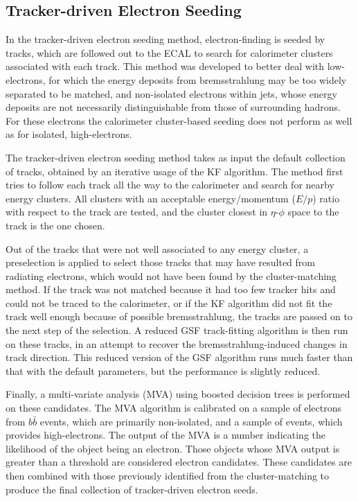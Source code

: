 \subsection{Tracker-driven Electron Seeding}
\label{evReco:trkDrv}
In the tracker-driven electron seeding method, 
electron-finding is seeded by tracks, 
which are followed out to the 
ECAL to search for calorimeter clusters 
associated with each track.  
This method was developed to better deal with 
low-\pT electrons, for which the energy deposits 
from bremsstrahlung may be too widely separated 
to be matched,  
and non-isolated electrons within jets, 
whose energy deposits are not necessarily 
distinguishable from those of surrounding hadrons.  
For these electrons the calorimeter cluster-based 
seeding does not perform as well as for 
isolated, high-\pT electrons.  

The tracker-driven electron seeding method 
takes as input the default collection 
of tracks, obtained by an iterative usage 
of the KF algorithm.  
The method first tries to follow each track 
all the way to the calorimeter and search 
for nearby energy clusters.  
All clusters with an acceptable 
energy/momentum ($E/p$) ratio 
with respect to the track are tested, 
and the cluster closest in $\eta$-$\phi$ 
space to the track is the one chosen. 
 
Out of the tracks that were not 
well associated to any energy cluster, 
a preselection is applied to select 
those tracks that may have resulted from 
radiating electrons, 
which would not have been found 
by the cluster-matching method.  
If the track was not matched because it had 
too few tracker hits and could not be traced 
to the calorimeter, 
or if the KF algorithm did not fit the 
track well enough because of possible 
bremsstrahlung, the tracks are passed 
on to the next step of the selection.  
A reduced GSF track-fitting algorithm 
is then run on these tracks, 
in an attempt to recover the 
bremsstrahlung-induced changes in track direction. 
This reduced version of the GSF algorithm runs 
much faster than that with the default parameters, 
but the performance is slightly reduced.  

Finally, a multi-variate analysis (MVA) using 
boosted decision trees 
is performed on these candidates.  
The MVA algorithm is 
calibrated 
on a sample of electrons from 
$b \bar{b}$ events, which are primarily non-isolated, 
and a sample of \Zee events, 
which provides high-\pT electrons.  
The output of the MVA is a number indicating 
the likelihood of the object being an electron.   
Those objects whose MVA output is greater than a threshold 
are considered electron candidates. 
These candidates are then combined with those 
previously identified from the cluster-matching 
to produce the final collection of 
tracker-driven electron seeds.  

